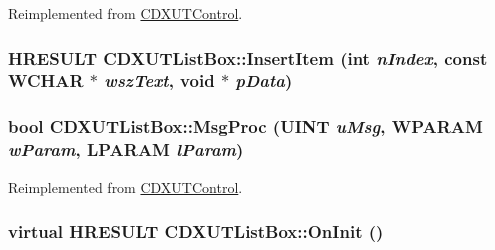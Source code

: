 Reimplemented from \hyperlink{class_c_d_x_u_t_control_a263979b3221cb7a44b4caea72366c335}{CDXUTControl}.\hypertarget{class_c_d_x_u_t_list_box_a894dfd0e0df7a8ce39268f067f5d5d06}{
\subsubsection[{InsertItem}]{\setlength{\rightskip}{0pt plus 5cm}HRESULT CDXUTListBox::InsertItem ({\bf int} {\em nIndex}, \/  const WCHAR $\ast$ {\em wszText}, \/  void $\ast$ {\em pData})}}
\label{class_c_d_x_u_t_list_box_a894dfd0e0df7a8ce39268f067f5d5d06}
\hypertarget{class_c_d_x_u_t_list_box_a05c8bdcfa42cb829df9b6797684ae938}{
\subsubsection[{MsgProc}]{\setlength{\rightskip}{0pt plus 5cm}bool CDXUTListBox::MsgProc (UINT {\em uMsg}, \/  WPARAM {\em wParam}, \/  LPARAM {\em lParam})}}
\label{class_c_d_x_u_t_list_box_a05c8bdcfa42cb829df9b6797684ae938}


Reimplemented from \hyperlink{class_c_d_x_u_t_control_a58d0d118146c8853a7ccd27da9e3fcf3}{CDXUTControl}.\hypertarget{class_c_d_x_u_t_list_box_af999f44d44f4b6aa1f434d95317119af}{
\subsubsection[{OnInit}]{\setlength{\rightskip}{0pt plus 5cm}virtual HRESULT CDXUTListBox::OnInit ()}}
\label{class_c_d_x_u_t_list_box_af999f44d44f4b6aa1f434d95317119af}


